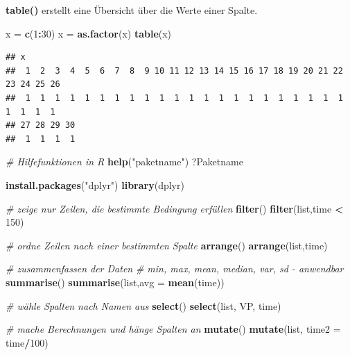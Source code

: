\documentclass[]{book}
\newenvironment{Shaded}{\begin{snugshade}}{\end{snugshade}}
\newcommand{\KeywordTok}[1]{\textcolor[rgb]{0.13,0.29,0.53}{\textbf{#1}}}
\newcommand{\DataTypeTok}[1]{\textcolor[rgb]{0.13,0.29,0.53}{#1}}
\newcommand{\DecValTok}[1]{\textcolor[rgb]{0.00,0.00,0.81}{#1}}
\newcommand{\StringTok}[1]{\textcolor[rgb]{0.31,0.60,0.02}{#1}}
\newcommand{\CommentTok}[1]{\textcolor[rgb]{0.56,0.35,0.01}{\textit{#1}}}
\newcommand{\OperatorTok}[1]{\textcolor[rgb]{0.81,0.36,0.00}{\textbf{#1}}}
\newcommand{\NormalTok}[1]{#1}
\begin{document}
\textbf{table()} erstellt eine Übersicht über die Werte einer Spalte.

\begin{Shaded}
\begin{Highlighting}[]
\NormalTok{x =}\StringTok{ }\KeywordTok{c}\NormalTok{(}\DecValTok{1}\OperatorTok{:}\DecValTok{30}\NormalTok{)}
\NormalTok{x =}\StringTok{ }\KeywordTok{as.factor}\NormalTok{(x)}
\KeywordTok{table}\NormalTok{(x)}
\end{Highlighting}
\end{Shaded}

\begin{verbatim}
## x
##  1  2  3  4  5  6  7  8  9 10 11 12 13 14 15 16 17 18 19 20 21 22 23 24 25 26 
##  1  1  1  1  1  1  1  1  1  1  1  1  1  1  1  1  1  1  1  1  1  1  1  1  1  1 
## 27 28 29 30 
##  1  1  1  1
\end{verbatim}

\begin{Shaded}
\begin{Highlighting}[]
\CommentTok{# Hilfefunktionen in R}
\KeywordTok{help}\NormalTok{(}\StringTok{"paketname"}\NormalTok{)}
\NormalTok{?Paketname}
\end{Highlighting}
\end{Shaded}

\begin{Shaded}
\begin{Highlighting}[]
\KeywordTok{install.packages}\NormalTok{(}\StringTok{"dplyr"}\NormalTok{)}
\KeywordTok{library}\NormalTok{(dplyr)}

\CommentTok{# zeige nur Zeilen, die bestimmte Bedingung erfüllen}
\KeywordTok{filter}\NormalTok{()}
\KeywordTok{filter}\NormalTok{(list,time }\OperatorTok{<}\StringTok{ }\DecValTok{150}\NormalTok{)}

\CommentTok{# ordne Zeilen nach einer bestimmten Spalte}
\KeywordTok{arrange}\NormalTok{()}
\KeywordTok{arrange}\NormalTok{(list,time)}
\end{Highlighting}
\end{Shaded}

\begin{Shaded}
\begin{Highlighting}[]
\CommentTok{# zusammenfassen der Daten}
\CommentTok{# min, max, mean, median, var, sd - anwendbar}
\KeywordTok{summarise}\NormalTok{()}
\KeywordTok{summarise}\NormalTok{(list,}\DataTypeTok{avg =} \KeywordTok{mean}\NormalTok{(time))}

\CommentTok{# wähle Spalten nach Namen aus}
\KeywordTok{select}\NormalTok{()}
\KeywordTok{select}\NormalTok{(list, VP, time)}

\CommentTok{# mache Berechnungen und hänge Spalten an}
\KeywordTok{mutate}\NormalTok{()}
\KeywordTok{mutate}\NormalTok{(list, }\DataTypeTok{time2 =}\NormalTok{ time}\OperatorTok{/}\DecValTok{100}\NormalTok{)}
\end{Highlighting}
\end{Shaded}
\end{document}
